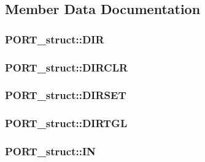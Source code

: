 \subsection{Member Data Documentation}
\hypertarget{struct_p_o_r_t__struct_ae70ac724d575f7902ceadd5af7ec3163}{
\subsubsection[{DIR}]{ {\bf PORT\_\-struct::DIR}}}
\label{struct_p_o_r_t__struct_ae70ac724d575f7902ceadd5af7ec3163}
\hypertarget{struct_p_o_r_t__struct_a7459f47076d9cf3f8581c8a1410f3f6a}{
\subsubsection[{DIRCLR}]{ {\bf PORT\_\-struct::DIRCLR}}}
\label{struct_p_o_r_t__struct_a7459f47076d9cf3f8581c8a1410f3f6a}
\hypertarget{struct_p_o_r_t__struct_a3c0d316f069740be22c224189546b8d5}{
\subsubsection[{DIRSET}]{ {\bf PORT\_\-struct::DIRSET}}}
\label{struct_p_o_r_t__struct_a3c0d316f069740be22c224189546b8d5}
\hypertarget{struct_p_o_r_t__struct_a4199abf82b32e254b4021486513847b9}{
\subsubsection[{DIRTGL}]{ {\bf PORT\_\-struct::DIRTGL}}}
\label{struct_p_o_r_t__struct_a4199abf82b32e254b4021486513847b9}
\hypertarget{struct_p_o_r_t__struct_aa21f12a291d825910a470ef824478ed3}{
\subsubsection[{IN}]{ {\bf PORT\_\-struct::IN}}}
